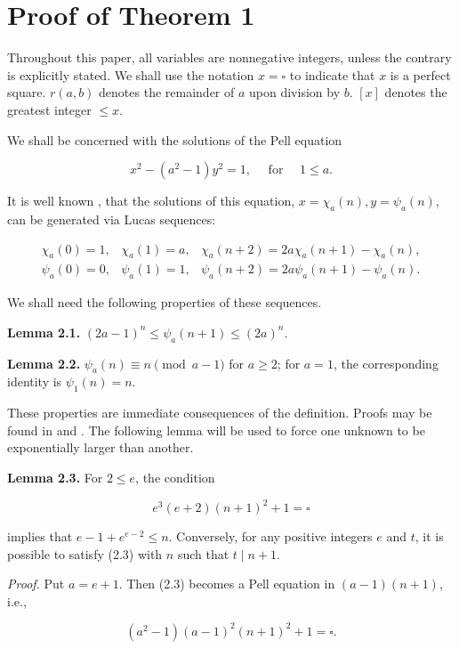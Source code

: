 \documentclass[10pt,letterpaper]{article}
\newcommand{\statement}[1]{\par\medskip\noindent\textbf{#1}\enspace}
\begin{document}
\section{Proof of Theorem 1} Throughout this paper, all variables are nonnegative integers, unless the contrary is explicitly stated. We shall use the notation $x=\square$ to indicate that $x$ is a perfect square. $r(a, b)$ denotes the remainder of $a$ upon division by $b$. $[x]$ denotes the greatest integer $\leq x$.

We shall be concerned with the solutions of the Pell equation

\[
x^{2}-\left(a^{2}-1\right) y^{2}=1, \quad \text { for } \quad 1 \leq a .
\]

It is well known \cite{ref3}, \cite{ref16} that the solutions of this equation, $x=\chi_{a}(n), y=\psi_{a}(n)$, can be generated via Lucas sequences:

\[
\begin{array}{lll}
\chi_{a}(0)=1, & \chi_{a}(1)=a, & \chi_{a}(n+2)=2a\chi_a(n+1)-\chi_a(n), \\
\psi_{a}(0)=0, & \psi_{a}(1)=1, & \psi_{a}(n+2)=2 a \psi_{a}(n+1)-\psi_{a}(n) .
\end{array}
\]

We shall need the following properties of these sequences.

\statement{Lemma 2.1.} $(2 a-1)^{n} \leq \psi_{a}(n+1) \leq(2 a)^{n}$.

\statement{Lemma 2.2.} $\psi_a(n)\equiv n\pmod{a-1}$ for $a\geq2$; for $a=1$, the corresponding identity is $\psi_1(n)=n$.


These properties are immediate consequences of the definition. Proofs may be found in \cite{ref3} and \cite{ref11}. The following lemma will be used to force one unknown to be exponentially larger than another.

\statement{Lemma 2.3.} For $2 \leq e$, the condition


\begin{equation*}
e^{3}(e+2)(n+1)^{2}+1=\square \tag{2.3}
\end{equation*}


implies that $e-1+e^{e-2} \leq n$. Conversely, for any positive integers $e$ and $t$, it is possible to satisfy (2.3) with $n$ such that $t \mid n+1$.

\textit{Proof.} Put $a=e+1$. Then (2.3) becomes a Pell equation in $(a-1)(n+1)$, i.e.,

\[
\left(a^{2}-1\right)(a-1)^{2}(n+1)^{2}+1=\square .
\]
\end{document}
